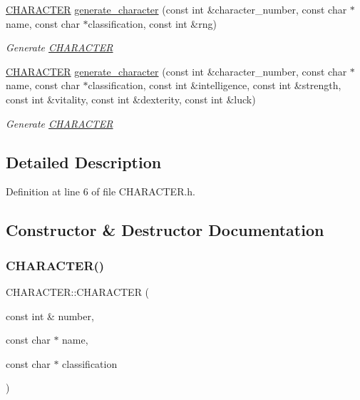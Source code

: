 \begin{DoxyCompactItemize}
\mbox{\hyperlink{class_c_h_a_r_a_c_t_e_r}{C\+H\+A\+R\+A\+C\+T\+ER}} \mbox{\hyperlink{class_c_h_a_r_a_c_t_e_r_a629e78cbce60fdaf5353ed254d1ea21d}{generate\+\_\+character}} (const int \&character\+\_\+number, const char $\ast$name, const char $\ast$classification, const int \&rng)
\begin{DoxyCompactList}\small\item\em Generate \mbox{\hyperlink{class_c_h_a_r_a_c_t_e_r}{C\+H\+A\+R\+A\+C\+T\+ER}} \end{DoxyCompactList}\item 
\mbox{\hyperlink{class_c_h_a_r_a_c_t_e_r}{C\+H\+A\+R\+A\+C\+T\+ER}} \mbox{\hyperlink{class_c_h_a_r_a_c_t_e_r_a4a8320581754bd920e2427c53d05d6fd}{generate\+\_\+character}} (const int \&character\+\_\+number, const char $\ast$name, const char $\ast$classification, const int \&intelligence, const int \&strength, const int \&vitality, const int \&dexterity, const int \&luck)
\begin{DoxyCompactList}\small\item\em Generate \mbox{\hyperlink{class_c_h_a_r_a_c_t_e_r}{C\+H\+A\+R\+A\+C\+T\+ER}} \end{DoxyCompactList}\end{DoxyCompactItemize}


\subsection{Detailed Description}


Definition at line 6 of file C\+H\+A\+R\+A\+C\+T\+E\+R.\+h.



\subsection{Constructor \& Destructor Documentation}
\mbox{\label{class_c_h_a_r_a_c_t_e_r_a443ff58bbda601d4e46619cbc67ee874}} 
\subsubsection{\texorpdfstring{CHARACTER()}{CHARACTER()}\hspace{0.1cm}{\footnotesize\ttfamily [1/4]}}
{\footnotesize\ttfamily C\+H\+A\+R\+A\+C\+T\+E\+R\+::\+C\+H\+A\+R\+A\+C\+T\+ER (\begin{DoxyParamCaption}\item[{const int \&}]{number,  }\item[{const char $\ast$}]{name,  }\item[{const char $\ast$}]{classification }\end{DoxyParamCaption})}



